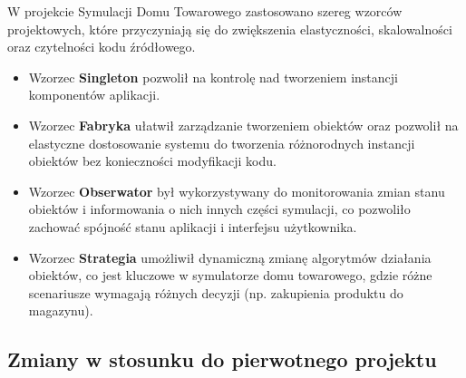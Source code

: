 \documentclass[11pt]{article}
\begin{document}
W projekcie Symulacji Domu Towarowego zastosowano szereg wzorców projektowych, które przyczyniają się do zwiększenia elastyczności, skalowalności oraz czytelności kodu źródłowego.

\begin{itemize}
    \item Wzorzec \textbf{Singleton} pozwolił na kontrolę nad tworzeniem instancji komponentów aplikacji.
    \item Wzorzec \textbf{Fabryka} ułatwił zarządzanie tworzeniem obiektów oraz pozwolił na elastyczne dostosowanie systemu do tworzenia różnorodnych instancji obiektów bez konieczności modyfikacji kodu.
    \item Wzorzec \textbf{Obserwator} był wykorzystywany do monitorowania zmian stanu obiektów i informowania o nich innych części symulacji, co pozwoliło zachować spójność stanu aplikacji i interfejsu użytkownika.
    \item Wzorzec \textbf{Strategia} umożliwił dynamiczną zmianę algorytmów działania obiektów, co jest kluczowe w symulatorze domu towarowego, gdzie różne scenariusze wymagają różnych decyzji (np. zakupienia produktu do magazynu).
\end{itemize}

\subsection{Zmiany w stosunku do pierwotnego projektu}
\end{document}
